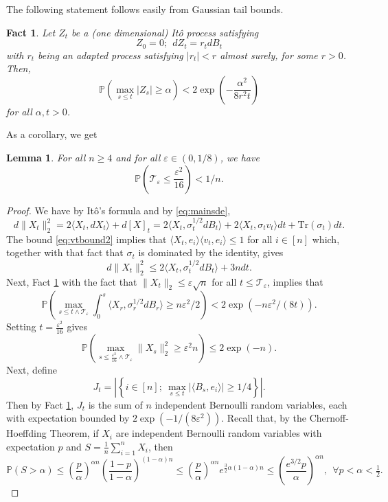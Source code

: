 \documentclass[12pt]{article}
\def \PP {\mathbb P}
\def \eps {\varepsilon}
\def \TTT {\mathcal{T}}
\def \tr {\mathrm{Tr}}
\newtheorem{lemma}[theorem]{Lemma}
\newtheorem{fact}[theorem]{Fact}
\theoremstyle{definition}
\theoremstyle{remark}
\begin{document}
The following statement follows easily from Gaussian tail bounds.
\begin{fact} \label{fact:tailmax}
Let $Z_t$ be a (one dimensional) It\^{o} process satisfying
$$
Z_0 = 0; ~~ d Z_t = r_t d B_t
$$
with $r_t$ being an adapted process satisfying $|r_t| < r$ almost surely, for some $r>0$. Then,
$$
\PP \left ( \max_{s \leq t} |Z_s| \geq \alpha \right ) < 2 \exp \left (-\frac{\alpha^2}{8r^2 t} \right )
$$
for all $\alpha,t>0$.
\end{fact}

As a corollary, we get
\begin{lemma} \label{lem:Tbig}
For all $n \geq 4$ and for all $\eps \in \left (0 ,1/8 \right )$, we have
$$
\PP \left (\TTT_\eps \leq \frac{\eps^2}{16} \right ) < 1/n.
$$
\end{lemma}
\begin{proof}
We have by It\^{o}'s formula and by \eqref{eq:mainsde},
$$
d \| X_t \|_2^2 = 2 \langle X_t, d X_t \rangle + d [X]_t = 2 \langle X_t, \sigma_t^{1/2} d B_t \rangle + 2 \langle X_t, \sigma_t v_t \rangle dt + \tr(\sigma_t) dt.
$$
The bound \eqref{eq:vtbound2} implies that $\langle X_t, e_i \rangle \langle v_t, e_i \rangle \leq 1$ for all $i \in [n]$ which, together with that fact that $\sigma_t$ is dominated by the identity, gives
$$
d \| X_t \|_2^2 \leq 2 \langle X_t, \sigma_t^{1/2} d B_t \rangle + 3n dt.
$$
Next, Fact \ref{fact:tailmax} with the fact that $\|X_t\|_2 \leq \eps \sqrt{n}$ for all $t \leq \TTT_\eps$, implies that
$$
\PP \left ( \max_{s \leq t \wedge \TTT_\eps} \int_0^s \langle X_r, \sigma_r^{1/2} d B_r \rangle \geq n \eps^2 / 2 \right ) < 2 \exp \left (-n \eps^2 / (8t) \right ).
$$
Setting $t = \frac{\eps^2}{16}$ gives
$$
\PP \left ( \max_{s \leq \tfrac{\eps^2}{16} \wedge \TTT_\eps } \| X_s\|_2^2 \geq \eps^2 n \right ) \leq 2 \exp(-n).
$$
Next, define 
$$
J_t = \left | \left \{ i \in [n]; ~ \max_{s \leq t} |\langle B_s, e_i \rangle| \geq 1/4 \right \} \right |.
$$ 
Then by Fact \ref{fact:tailmax}, $J_t$ is the sum of $n$ independent Bernoulli random variables, each with expectation bounded by $2\exp(-1/(8\eps^2))$. Recall that, by the Chernoff-Hoeffding Theorem, if $X_i$ are independent Bernoulli random variables with expectation $p$ and $S = \tfrac{1}{n} \sum_{i=1}^n X_i$, then
$$
\PP( S > \alpha ) \leq \left (\frac{p}{\alpha}\right )^{ \alpha n } \left (\frac{1-p}{1-\alpha}\right )^{ (1-\alpha) n } \leq \left (\frac{p}{\alpha}\right )^{ \alpha n } e^{\tfrac{3}{2} \alpha (1-\alpha) n} \leq \left (\frac{e^{3/2} p}{\alpha}\right )^{\alpha n }  , ~~ \forall p < \alpha < \tfrac{1}{2}.
$$
\end{proof}
\end{document}
